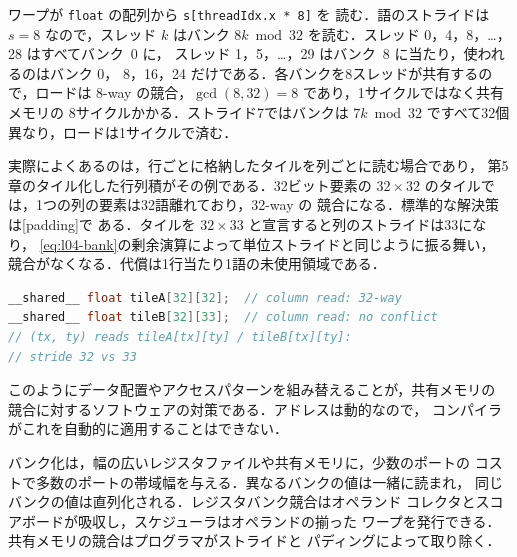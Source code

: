 \documentclass[../main.tex]{subfiles}
\begin{document}
\begin{example}
  \label{ex:l04-smem-stride}
  ワープが \texttt{float} の配列から \texttt{s[threadIdx.x * 8]} を
  読む．語のストライドは $s = 8$ なので，スレッド $k$ はバンク
  $8k \bmod 32$ を読む．スレッド 0，4，8，\ldots，28 はすべてバンク~0 に，
  スレッド 1，5，\ldots，29 はバンク~8 に当たり，使われるのはバンク 0，
  8，16，24 だけである．各バンクを8スレッドが共有するので，ロードは
  8-way の競合，$\gcd(8, 32) = 8$ であり，1サイクルではなく共有メモリの
  8サイクルかかる．ストライド7ではバンクは $7k \bmod 32$ ですべて32個
  異なり，ロードは1サイクルで済む．
\end{example}

実際によくあるのは，行ごとに格納したタイルを列ごとに読む場合であり，
第5章のタイル化した行列積がその例である．32ビット要素の
$32 \times 32$ のタイルでは，1つの列の要素は32語離れており，32-way の
競合になる．標準的な解決策は[padding]で
ある．タイルを $32 \times 33$ と宣言すると列のストライドは33になり，
\cref{eq:l04-bank}の剰余演算によって単位ストライドと同じように振る舞い，
競合がなくなる．代償は1行当たり1語の未使用領域である．
\begin{lstlisting}[language=C++, numbers=none]
__shared__ float tileA[32][32];  // column read: 32-way
__shared__ float tileB[32][33];  // column read: no conflict
// (tx, ty) reads tileA[tx][ty] / tileB[tx][ty]:
// stride 32 vs 33
\end{lstlisting}
このようにデータ配置やアクセスパターンを組み替えることが，共有メモリの
競合に対するソフトウェアの対策である．アドレスは動的なので，
コンパイラがこれを自動的に適用することはできない．

\begin{keypoint}
  バンク化は，幅の広いレジスタファイルや共有メモリに，少数のポートの
  コストで多数のポートの帯域幅を与える．異なるバンクの値は一緒に読まれ，
  同じバンクの値は直列化される．レジスタバンク競合はオペランド
  コレクタとスコアボードが吸収し，スケジューラはオペランドの揃った
  ワープを発行できる．共有メモリの競合はプログラマがストライドと
  パディングによって取り除く．
\end{keypoint}
\end{document}
